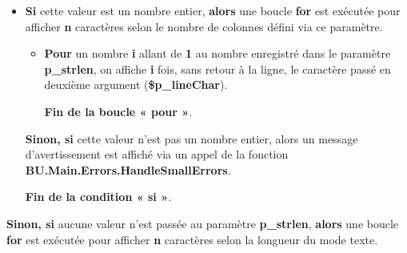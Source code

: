 \documentclass[a4paper,10pt]{article}
\begin{document}
    \begin{itemize}
        \item
        {
            \begin{justify}
                \textbf{\color{cond}Si} cette valeur est un nombre entier, \textbf{\color{cond}alors} une boucle \textbf{\color{loop}for} est exécutée pour afficher \textbf{n} caractères selon le nombre de colonnes défini via ce paramètre.\setlength{\parskip}{2em}
            \end{justify}

            \setlength{\parskip}{1em}

            \begin{itemize}
                \item
                {
                    \begin{justify}
                        \textbf{\color{loop}Pour} un nombre \textbf{\color{vars}i} allant de \textbf{\color{loop}1} au nombre enregistré dans le paramètre \textbf{\color{vars}p\_strlen}, on affiche \textbf{\color{vars}i} fois, sans retour à la ligne, le caractère passé en deuxième argument (\textbf{\color{vars}\$p\_lineChar}).
                    \end{justify}\setlength{\parskip}{1em}

                    \begin{justify}
                        \textbf{\color{loop}Fin de la boucle « pour »}.
                    \end{justify}
                }
            \end{itemize}

            \begin{justify}
                \textbf{\color{cond}Sinon, si} cette valeur n'est pas un nombre entier, alors un message d'avertissement est affiché via un appel de la fonction \textbf{\color{func}BU.Main.Errors.HandleSmallErrors}.
            \end{justify}

            \setlength{\parskip}{1em}

            \begin{justify}
                \textbf{\color{cond}Fin de la condition « si »}.
            \end{justify}

            \setlength{\parskip}{1em}
        }
    \end{itemize}


    \begin{justify}
        \textbf{\color{cond}Sinon, si} aucune valeur n'est passée au paramètre \textbf{\color{vars}p\_strlen}, \textbf{\color{cond}alors} une boucle \textbf{\color{loop}for} est exécutée pour afficher \textbf{n} caractères selon la longueur du mode texte.
    \end{justify}\setlength{\parskip}{1em}
\end{document}
